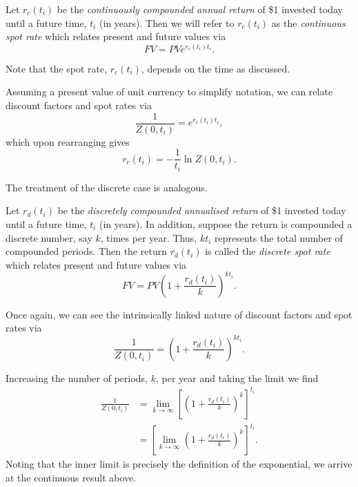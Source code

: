 \begin{definition}
\label{cont_zero_rate}
    Let $r_c(t_i)$ be the \textit{continuously compounded annual return} of \$1 invested today until a future time, $t_i$ (in years). Then we will refer to $r_c(t_i)$ as the \textit{continuous spot rate} which relates present and future values via
    \begin{equation}
        FV =  PV e^{r_c(t_i) t_i}.
    \end{equation}
\end{definition} 
Note that the spot rate, $r_c(t_i)$, depends on the time as discussed.

Assuming a present value of unit currency to simplify notation, we can relate discount factors and spot rates via
\begin{equation}
    \frac{1}{Z(0,t_i)} = e^{r_c(t_i) t_i},
\end{equation}
which upon rearranging gives
\begin{equation}
    r_{c}(t_i) = -\frac{1}{t_i} \ln Z(0,t_i).
\end{equation}

The treatment of the discrete case is analogous.

\begin{definition}
\label{zero_rate}
    Let $r_d(t_i)$ be the \textit{discretely compounded annualised return} of \$1 invested today until a future time, $t_i$ (in years). In addition, suppose the return is compounded a discrete number, say $k$, times per year. Thus, $kt_i$ represents the total number of compounded periods. Then the return $r_d(t_i)$ is called the \textit{discrete spot rate} which relates present and future values via
    \begin{equation}
        FV =  PV \left(1 + \frac{r_d(t_i)}{k} \right)^{k t_i}.
    \end{equation}
\end{definition}

Once again, we can see the intrinsically linked nature of discount factors and spot rates via
\begin{equation}
    \frac{1}{Z(0,t_i)} = \left(1 + \frac{r_d(t_i)}{k} \right)^{k t_i}.
\end{equation}

Increasing the number of periods, $k$, per year and taking the limit we find
\begin{align}
    \frac{1}{Z(0,t_i)} &= \lim_{k \rightarrow \infty} \left[ \left(1 + \frac{r_d(t_i)}{k} \right)^{k} \right]^{t_i} \\
    &= \left[ \lim_{k \rightarrow \infty} \left(1 + \frac{r_d(t_i)}{k} \right)^{k} \right]^{t_i}.
\end{align}
Noting that the inner limit is precisely the definition of the exponential, we arrive at the continuous result above. 

